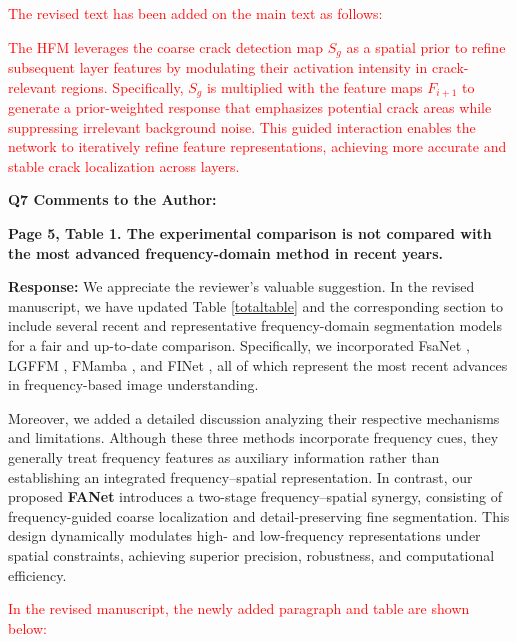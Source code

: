 \documentclass[lettersize,journal,onecolumn,12pt]{IEEEtran}
\begin{document}
\textcolor{red}{The revised text has been added on the main text as follows:}

\textcolor{red}{The HFM leverages the coarse crack detection map $S_g$ as a spatial prior to refine subsequent layer features by modulating their activation intensity in crack-relevant regions. 
Specifically, $S_g$ is multiplied with the feature maps $F_{i+1}$ to generate a prior-weighted response that emphasizes potential crack areas while suppressing irrelevant background noise. 
This guided interaction enables the network to iteratively refine feature representations, achieving more accurate and stable crack localization across layers.}\\ [10pt]




{\color{BlueGreen} \textbf{Q7 Comments to the Author:}

\textbf{Page 5, Table 1. The experimental comparison is not compared with the most advanced frequency-domain method in recent years.}} 

\textbf{Response:}
We appreciate the reviewer’s valuable suggestion. In the revised manuscript, we have updated Table \ref{totaltable} and the corresponding section to include several recent and representative frequency-domain segmentation models for a fair and up-to-date comparison. Specifically, we incorporated FsaNet \cite{DBLP:journals/tip/ZhangPG23}, LGFFM \cite{11129883TMI}, FMamba \cite{DBLP:journals/tim/LiuLLWZS25}, and FINet \cite{DBLP:journals/tcsv/WangZZGY25}, all of which represent the most recent advances in frequency-based image understanding.

Moreover, we added a detailed discussion analyzing their respective mechanisms and limitations. Although these three methods incorporate frequency cues, they generally treat frequency features as auxiliary information rather than establishing an integrated frequency–spatial representation. In contrast, our proposed \textbf{FANet} introduces a two-stage frequency–spatial synergy, consisting of frequency-guided coarse localization and detail-preserving fine segmentation. This design dynamically modulates high- and low-frequency representations under spatial constraints, achieving superior precision, robustness, and computational efficiency.

\textcolor{red}{In the revised manuscript, the newly added paragraph and table are shown below:}
\end{document}
